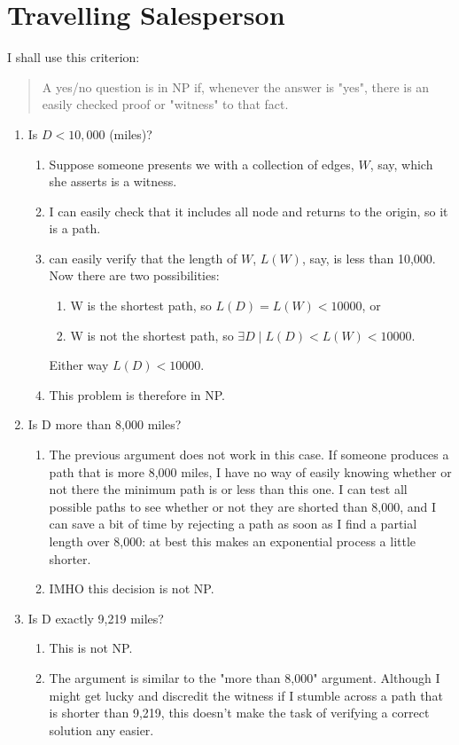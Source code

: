 \documentclass[]{article}
\begin{document}
\section{Travelling Salesperson}

I shall use this criterion: \begin{quotation}
	A yes/no question is in NP if, whenever the answer is "yes", there is an easily checked proof or "witness" to that fact\cite[Lecture 3.5]{sfi2020computation}.
\end{quotation}

\begin{enumerate}
	\item Is $D<10,000$ (miles)?
	\begin{enumerate}
		\item Suppose someone presents we with a collection of edges, 
			$W$, say, which she asserts is a witness.
		\item I can easily check that it includes all node and returns to the origin, so it is a path.
		\item can easily verify that the length of $W$, $L(W)$, say, is less than 10,000. Now there are two possibilities:
		\begin{enumerate}
			\item W is the shortest path, so  $L(D)=L(W)<10000$, or
			\item W is not the shortest path, so $\exists D \mid L(D)<L(W)<10000$.
		\end{enumerate}
		Either way $L(D)<10000$.
		\item This problem is therefore in NP.
	\end{enumerate}
	
	\item Is D more than 8,000 miles?
		\begin{enumerate}
		\item The previous argument does not work in this case. If someone produces a path that is more 8,000 miles, I have no way of easily knowing whether or not there the minimum path is or less than this one. I can test all possible paths to see whether or not they are shorted than 8,000, and I can save a bit of time by rejecting a path as soon as I find a partial length over 8,000: at best this makes an exponential process a little shorter.
		\item IMHO this decision is not NP.  
	\end{enumerate}
	
	\item Is D exactly 9,219 miles? 
		\begin{enumerate}
		\item This is not NP.
		\item The argument is similar to the "more than 8,000" argument. Although I might get lucky and discredit the witness if I stumble across a path that is shorter than 9,219, this doesn't make the task of verifying a correct solution any easier. 
	\end{enumerate}
\end{enumerate}
\end{document}
